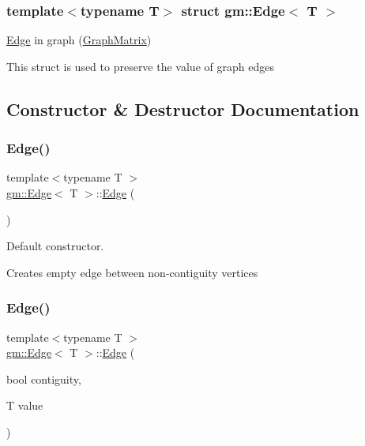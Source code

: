 \subsubsection*{template$<$typename T$>$\newline
struct gm\+::\+Edge$<$ T $>$}

\mbox{\hyperlink{structgm_1_1_edge}{Edge}} in graph (\mbox{\hyperlink{classgm_1_1_graph_matrix}{Graph\+Matrix}}) 

This struct is used to preserve the value of graph edges 

\subsection{Constructor \& Destructor Documentation}
\mbox{\label{structgm_1_1_edge_a16a869644977808f26b775d0f53128f9}} 
\subsubsection{\texorpdfstring{Edge()}{Edge()}\hspace{0.1cm}{\footnotesize\ttfamily [1/2]}}
{\footnotesize\ttfamily template$<$typename T $>$ \\
\mbox{\hyperlink{structgm_1_1_edge}{gm\+::\+Edge}}$<$ T $>$\+::\mbox{\hyperlink{structgm_1_1_edge}{Edge}} (\begin{DoxyParamCaption}{ }\end{DoxyParamCaption})}



Default constructor. 

Creates empty edge between non-\/contiguity vertices \mbox{\label{structgm_1_1_edge_a32c86440a158bba7235181bd9e1c70a3}} 
\subsubsection{\texorpdfstring{Edge()}{Edge()}\hspace{0.1cm}{\footnotesize\ttfamily [2/2]}}
{\footnotesize\ttfamily template$<$typename T $>$ \\
\mbox{\hyperlink{structgm_1_1_edge}{gm\+::\+Edge}}$<$ T $>$\+::\mbox{\hyperlink{structgm_1_1_edge}{Edge}} (\begin{DoxyParamCaption}\item[{bool}]{contiguity,  }\item[{T}]{value }\end{DoxyParamCaption})}



